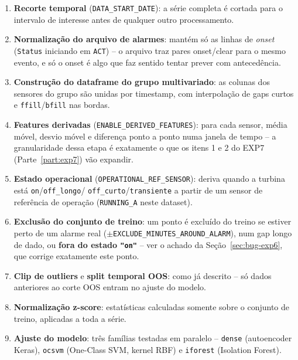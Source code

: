 \documentclass[11pt,a4paper]{article}
\begin{document}
\begin{enumerate}[leftmargin=*]

\item \textbf{Recorte temporal} (\texttt{DATA\_START\_DATE}): a série
  completa é cortada para o intervalo de interesse antes de qualquer outro
  processamento.

\item \textbf{Normalização do arquivo de alarmes}: mantém só as linhas de
  \emph{onset} (\texttt{Status} iniciando em \texttt{ACT}) -- o arquivo
  traz pares onset/clear para o mesmo evento, e só o onset é algo que faz
  sentido tentar prever com antecedência.

\item \textbf{Construção do dataframe do grupo multivariado}: as colunas
  dos sensores do grupo são unidas por timestamp, com interpolação de
  gaps curtos e \texttt{ffill}/\texttt{bfill} nas bordas.

\item \textbf{Features derivadas} (\texttt{ENABLE\_DERIVED\_FEATURES}):
  para cada sensor, média móvel, desvio móvel e diferença ponto a ponto
  numa janela de tempo -- a granularidade dessa etapa é exatamente o que
  os itens 1 e 2 do EXP7 (Parte~\ref{part:exp7}) vão expandir.

\item \textbf{Estado operacional} (\texttt{OPERATIONAL\_REF\_SENSOR}):
  deriva quando a turbina está \texttt{on}/\texttt{off\_longo}/
  \texttt{off\_curto}/\texttt{transiente} a partir de um sensor de
  referência de operação (\texttt{RUNNING\_A} neste dataset).

\item \textbf{Exclusão do conjunto de treino}: um ponto é excluído do
  treino se estiver perto de um alarme real
  ($\pm$\texttt{EXCLUDE\_MINUTES\_AROUND\_ALARM}), num gap longo de dado,
  ou \textbf{fora do estado \texttt{"on"}} -- ver o achado da
  Seção~\ref{sec:bug-exp6}, que corrige exatamente este ponto.

\item \textbf{Clip de outliers} e \textbf{split temporal OOS}: como já
  descrito -- só dados anteriores ao corte OOS entram no ajuste do modelo.

\item \textbf{Normalização z-score}: estatísticas calculadas somente sobre
  o conjunto de treino, aplicadas a toda a série.

\item \textbf{Ajuste do modelo}: três famílias testadas em paralelo --
  \texttt{dense} (autoencoder Keras), \texttt{ocsvm} (One-Class SVM,
  kernel RBF) e \texttt{iforest} (Isolation Forest).


\end{enumerate}
\end{document}
